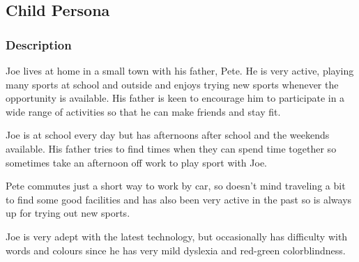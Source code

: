 \subsection{Child Persona}
\label{sub:child_persona}


\subsubsection*{Description}
\label{ssub:child_description}

Joe lives at home in a small town with his father, Pete. He is very active,
playing many sports at school and outside and enjoys trying new sports whenever
the opportunity is available. His father is keen to encourage him to
participate in a wide range of activities so that he can make friends and stay
fit.

Joe is at school every day but has afternoons after school and the weekends
available. His father tries to find times when they can spend time together so
sometimes take an afternoon off work to play sport with Joe.

Pete commutes just a short way to work by car, so doesn't mind traveling a bit
to find some good facilities and has also been very active in the past so is
always up for trying out new sports.

Joe is very adept with the latest technology, but occasionally has difficulty
with words and colours since he has very mild dyslexia and red-green
colorblindness.

